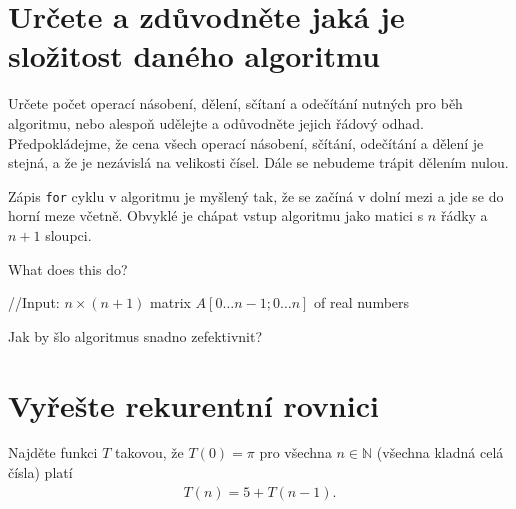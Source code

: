 \documentclass[12pt,oneside]{article}
\begin{document}
	\section{Určete a zdůvodněte jaká je složitost daného algoritmu}
	Určete počet operací násobení, dělení, sčítaní a odečítání nutných pro běh algoritmu, nebo alespoň udělejte a odůvodněte jejich řádový odhad.
	Předpokládejme, že cena všech operací násobení, sčítání, odečítání a dělení je stejná, a že je nezávislá na velikosti čísel.
	Dále se nebudeme trápit dělením nulou.
	
	Zápis \verb|for| cyklu v algoritmu je myšlený tak, že se začíná v dolní mezi a jde se do horní meze včetně.
	Obvyklé je chápat vstup algoritmu jako matici s $n$ řádky a $n+1$ sloupci.
	\begin{algorithm}[h]
		\caption{What does this do?}
		\DontPrintSemicolon
		//Input: $n\times (n+1)$ matrix $A[0\dots n-1; 0 \dots n]$ of real numbers \;
	\end{algorithm}
	
	Jak by šlo algoritmus snadno zefektivnit?
	
	\section{Vyřešte rekurentní rovnici}
	Najděte funkci $T$ takovou, že $T(0) = \pi$ pro všechna $n \in \mathbb{N}$ (všechna kladná celá čísla) platí
	\begin{align}
		T(n) = 5 + T(n-1).
	\end{align}
	
\end{document}
